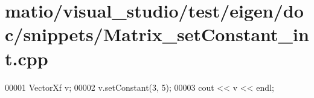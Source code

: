 \hypertarget{matio_2visual__studio_2test_2eigen_2doc_2snippets_2_matrix__set_constant__int_8cpp_source}{}\section{matio/visual\+\_\+studio/test/eigen/doc/snippets/\+Matrix\+\_\+set\+Constant\+\_\+int.cpp}
\label{matio_2visual__studio_2test_2eigen_2doc_2snippets_2_matrix__set_constant__int_8cpp_source}

\begin{DoxyCode}
00001 VectorXf v;
00002 v.setConstant(3, 5);
00003 cout << v << endl;
\end{DoxyCode}
